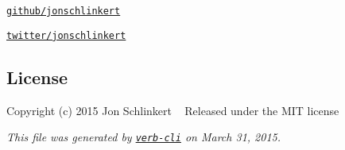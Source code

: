 \begin{DoxyItemize}
\item \href{https://github.com/jonschlinkert}{\tt github/jonschlinkert}
\item \href{http://twitter.com/jonschlinkert}{\tt twitter/jonschlinkert}
\end{DoxyItemize}

\subsection*{License}

Copyright (c) 2015 Jon Schlinkert ~\newline
Released under the M\+IT license





{\itshape This file was generated by \href{https://github.com/assemble/verb-cli}{\tt verb-\/cli} on March 31, 2015.} 